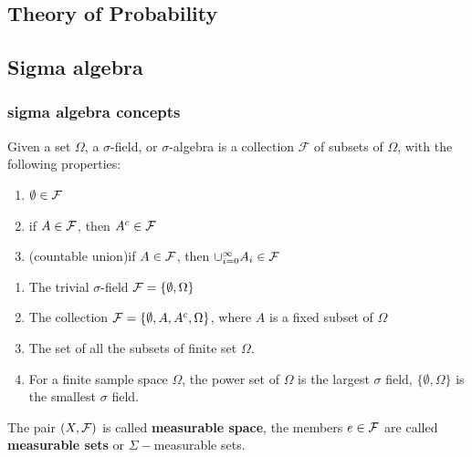 
\begin{refsection}
\startcontents[chapters]	
\chapter{Theory of Probability}\label{ch:theory-of-probability}

\section{Sigma algebra}
\subsection{sigma algebra concepts}
\begin{definition}
Given a set $\Omega$, a $\sigma$-field, or $\sigma$-algebra is a collection $\mathcal{F}$ of subsets of $\Omega$, with the following properties:
\begin{enumerate}
\item $\emptyset \in \mathcal{F}$
\item if $A \in \mathcal{F}$, then $A^c \in \mathcal{F}$
\item (countable union)if $A \in \mathcal{F}$, then $\cup_{i=0}^{\infty}A_i \in \mathcal{F}$
\end{enumerate}
\end{definition}

\begin{example}\hfill
\begin{enumerate}
\item The trivial $\sigma$-field $\mathcal{F} = \{ \emptyset, \Omega \}$
\item The collection $\mathcal{F}=\{\emptyset, A, A^c,\Omega \}$, where $A$ is a fixed subset of $\Omega$
\item The set of all the subsets of finite set $\Omega$.
\item For a finite sample space $\Omega$, the power set of $\Omega$ is the largest $\sigma$ field, $\{\emptyset,\Omega\}$ is the smallest $\sigma$ field.
\end{enumerate}
\end{example}


\begin{remark}
The pair $(X,\mathcal{F})$ is called \textbf{measurable space}, the members  $e\in \mathcal{F}$ are called \textbf{measurable sets} or $\Sigma-$measurable sets.
\end{remark}




\end{refsection}
